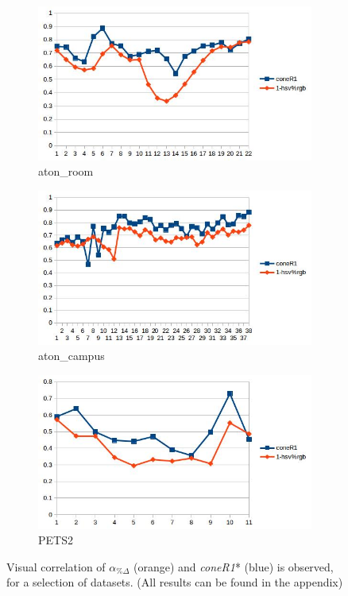 \documentclass[12pt]{report}
\begin{document}
\begin{figure}
  \centering
  \begin{subfigure}{1\linewidth}
  \includegraphics[width=1\linewidth]{figures/correlations/rgb/room_hsv.jpg}
  \caption{aton\_room}
\end{subfigure}
\hfill
\begin{subfigure}{.49\linewidth}
  \includegraphics[width=1\linewidth]{figures/correlations/rgb/campus_hsv.jpg}
  \caption{aton\_campus}
\end{subfigure}
\begin{subfigure}{.49\linewidth}
  \includegraphics[width=1\linewidth]{figures/correlations/rgb/pets2_hsv.jpg}
  \caption{PETS2}
\end{subfigure}

\caption{Visual correlation of $\alpha_{\%\Delta}$ (orange) and \textit{coneR1}* (blue) is observed, for a selection of datasets. (All results can be found in the appendix)}
\label{fig:corr_rgb}
\end{figure}
\end{document}
